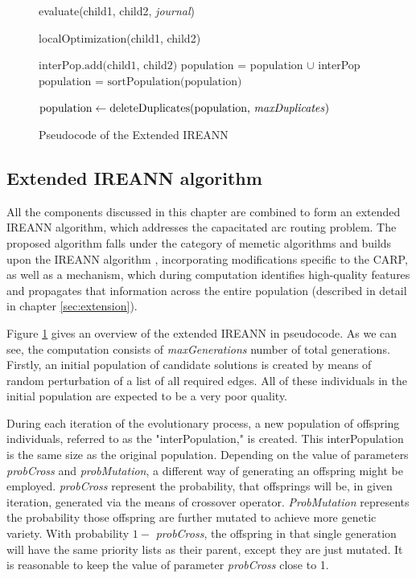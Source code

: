 \documentclass[twoside]{ctuthesis}
\theoremstyle{plain}
\theoremstyle{definition}
\theoremstyle{note}
\begin{document}
\begin{figure}
\begin{algorithmic}[1]
		\State evaluate(child1, child2, \emph{journal})
		
		\State localOptimization(child1, child2)
		
		
		\State $\text{interPop.add(child1, child2)}$
		\EndWhile
		\State population = population $\cup$ interPop
		\State $\text{population = sortPopulation(population)}$
		
		\State $\text{population} \gets \text{deleteDuplicates(population, \emph{maxDuplicates})}$
		\EndFor
		\EndFunction
		
		
	\end{algorithmic}
	\caption{Pseudocode of the Extended IREANN}
	\label{fig:evoalg}
	
\end{figure}

\subsection{Extended IREANN algorithm}
\label{sec:evolution}
All the components discussed in this chapter are combined to form an extended IREANN algorithm, which addresses the capacitated arc routing problem. The proposed algorithm falls under the category of memetic algorithms and builds upon the IREANN algorithm \cite{kubalik2014novel}, incorporating modifications specific to the CARP, as well as a mechanism, which during computation identifies high-quality features and propagates that information across the entire population (described in detail in chapter \ref{sec:extension}).

Figure \ref{fig:evoalg} gives an overview of the extended IREANN in pseudocode. As we can see, the computation consists of \emph{maxGenerations} number of total generations. Firstly, an initial population of candidate solutions is created by means of random perturbation of a list of all required edges. All of these individuals in the initial population are expected to be a very poor quality.

During each iteration of the evolutionary process, a new population of offspring individuals, referred to as the "interPopulation," is created. This interPopulation is the same size as the original population. Depending on the value of parameters \emph{probCross} and \emph{probMutation}, a different way of generating an offspring might be employed. \emph{probCross} represent the probability, that offsprings will be, in given iteration, generated via the means of crossover operator. \emph{ProbMutation} represents the probability those offspring are further mutated to achieve more genetic variety. With probability $1 -$ \emph{probCross}, the offspring in that single generation will have the same priority lists as their parent, except they are just mutated. It is reasonable to keep the value of parameter \emph{probCross} close to 1.
\end{document}
